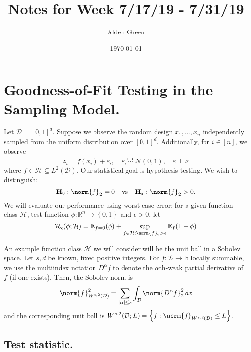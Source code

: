 \documentclass{article}
\newcommand{\Reals}{\mathbb{R}}
\newcommand{\abs}[1]{\left \lvert #1 \right \rvert}
\newcommand{\set}[1]{\left\{#1\right\}}
\newcommand{\1}{\mathbb{I}}
\newcommand{\D}{\mathcal{D}}
\newcommand{\Ebb}{\mathbb{E}}
\theoremstyle{alden}
\theoremstyle{aldenthm}
\theoremstyle{definition}
\theoremstyle{remark}
\begin{document}
\title{Notes for Week 7/17/19 - 7/31/19}
\author{Alden Green}
\date{\today}
\maketitle

\section{Goodness-of-Fit Testing in the Sampling Model.}

Let $\mathcal{D} = [0,1]^d$. Suppose we observe the random design $x_1,\ldots,x_n$ independently sampled from the uniform distribution over $[0,1]^d$. Additionally, for $i \in [n]$, we observe
\begin{equation*}
z_i = f(x_i) + \varepsilon_i, \quad \varepsilon_i \overset{\textrm{i.i.d}}{\sim} \mathcal{N}(0,1), \quad \varepsilon \perp x
\end{equation*}
where $f \in \mathcal{H} \subseteq L^2(\mathcal{D})$. Our statistical goal is hypothesis testing. We wish to distinguish:
\begin{equation*}
\mathbf{H}_0: \norm{f}_2 = 0 \quad \textrm{vs} \quad \mathbf{H}_a: \norm{f}_2 > 0. 
\end{equation*}
We will evaluate our performance using worst-case error: for a given function class $\mathcal{H}$, test function $\phi: \Reals^n \to \set{0,1}$ and $\epsilon> 0$, let
\begin{equation*}
\mathcal{R}_{\epsilon}(\phi; \mathcal{H}) = \Ebb_{f = 0}(\phi) + \sup_{f \in \mathcal{H}: \norm{f}_2 > \epsilon} \Ebb_f(1 - \phi)
\end{equation*}

An example function class $\mathcal{H}$ we will consider will be the unit ball in a Sobolev space. Let $s,d$ be known, fixed positive integers. For $f: \mathcal{D} \to \Reals$ locally summable, we use the multiindex notation $D^{\alpha}f$ to denote the $\alpha$th-weak partial derivative of $f$ (if one exists). Then, the Sobolev norm is 
\begin{equation*}
\norm{f}_{W^{s,2}(\D)}^2 = \sum_{\abs{\alpha} \leq s} \int_{\mathcal{D}} \norm{D^{\alpha}f}_2^2 \,dx
\end{equation*}
and the corresponding unit ball is $W^{s,2}(\D; L) = \set{f: \norm{f}_{W^{s,2}(\mathcal{D})} \leq L}$. 

\subsection{Test statistic.}
\end{document}
